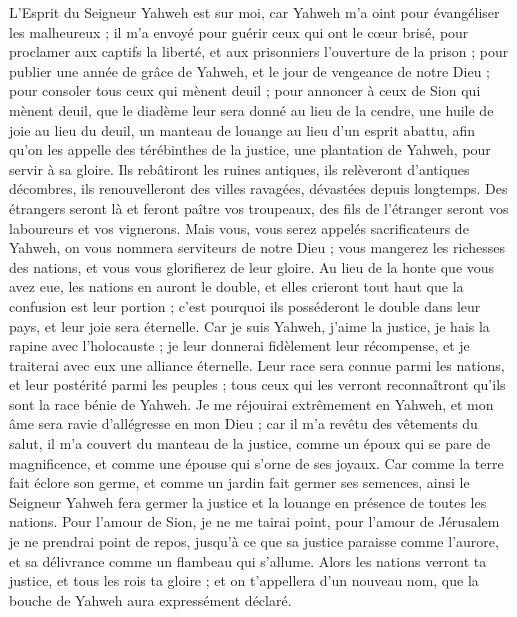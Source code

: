 \begin{multicols}{2}
\VerseOne{}L'Esprit du Seigneur Yahweh est sur moi, car Yahweh m'a oint pour évangéliser les malheureux ; il m'a envoyé pour guérir ceux qui ont le cœur brisé, pour proclamer aux captifs la liberté, et aux prisonniers l'ouverture de la prison ;
pour publier une année de grâce de Yahweh, et le jour de vengeance de notre Dieu ; pour consoler tous ceux qui mènent deuil ;
pour annoncer à ceux de Sion qui mènent deuil, que le diadème leur sera donné au lieu de la cendre, une huile de joie au lieu du deuil, un manteau de louange au lieu d'un esprit abattu, afin qu'on les appelle des térébinthes de la justice, une plantation de Yahweh, pour servir à sa gloire.
Ils rebâtiront les ruines antiques, ils relèveront d'antiques décombres, ils renouvelleront des villes ravagées, dévastées depuis longtemps.
Des étrangers seront là et feront paître vos troupeaux, des fils de l'étranger seront vos laboureurs et vos vignerons.
Mais vous, vous serez appelés sacrificateurs de Yahweh, on vous nommera serviteurs de notre Dieu ; vous mangerez les richesses des nations, et vous vous glorifierez de leur gloire.
Au lieu de la honte que vous avez eue, les nations en auront le double, et elles crieront tout haut que la confusion est leur portion ; c'est pourquoi ils posséderont le double dans leur pays, et leur joie sera éternelle.
Car je suis Yahweh, j'aime la justice, je hais la rapine avec l'holocauste ; je leur donnerai fidèlement leur récompense, et je traiterai avec eux une alliance éternelle.
Leur race sera connue parmi les nations, et leur postérité parmi les peuples ; tous ceux qui les verront reconnaîtront qu'ils sont la race bénie de Yahweh.
Je me réjouirai extrêmement en Yahweh, et mon âme sera ravie d'allégresse en mon Dieu ; car il m'a revêtu des vêtements du salut, il m'a couvert du manteau de la justice, comme un époux qui se pare de magnificence, et comme une épouse qui s'orne de ses joyaux.
Car comme la terre fait éclore son germe, et comme un jardin fait germer ses semences, ainsi le Seigneur Yahweh fera germer la justice et la louange en présence de toutes les nations.
\VerseOne{}Pour l'amour de Sion, je ne me tairai point, pour l'amour de Jérusalem je ne prendrai point de repos, jusqu'à ce que sa justice paraisse comme l'aurore, et sa délivrance comme un flambeau qui s'allume.
Alors les nations verront ta justice, et tous les rois ta gloire ; et on t'appellera d'un nouveau nom, que la bouche de Yahweh aura expressément déclaré.

\end{multicols}
